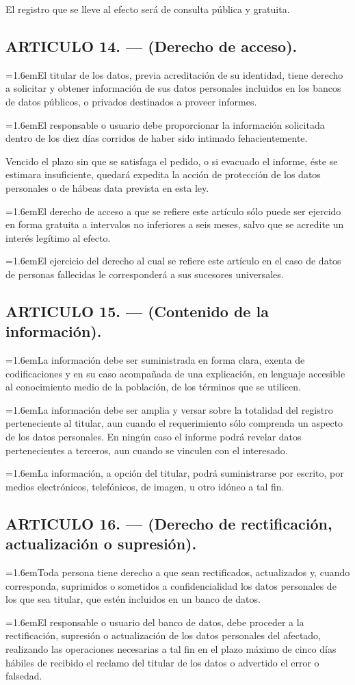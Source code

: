 \documentclass[10pt,a4paper]{article}
\newcommand{\articulo}[1]{\subsection{#1}}
\newcommand{\inciso}[2]{\par{\hangindent=1.6em\hangafter=1\makebox[1.6em][l]{#1}#2\par}}
\begin{document}
El registro que se lleve al efecto será de consulta pública y gratuita.

\articulo{ARTICULO 14. — (Derecho de acceso).}
\inciso{1.}{El titular de los datos, previa acreditación de su identidad, tiene derecho a solicitar y obtener información de sus datos personales incluidos en los bancos de datos públicos, o privados destinados a proveer informes.}

\inciso{2.}{El responsable o usuario debe proporcionar la información solicitada dentro de los diez días corridos de haber sido intimado fehacientemente.}

Vencido el plazo sin que se satisfaga el pedido, o si evacuado el informe, éste se estimara insuficiente, quedará expedita la acción de protección de los datos personales o de hábeas data prevista en esta ley.

\inciso{3.}{El derecho de acceso a que se refiere este artículo sólo puede ser ejercido en forma gratuita a intervalos no inferiores a seis meses, salvo que se acredite un interés legítimo al efecto.}

\inciso{4.}{El ejercicio del derecho al cual se refiere este artículo en el caso de datos de personas fallecidas le corresponderá a sus sucesores universales.}

\articulo{ARTICULO 15. — (Contenido de la información).}
\inciso{1.}{La información debe ser suministrada en forma clara, exenta de codificaciones y en su caso acompañada de una explicación, en lenguaje accesible al conocimiento medio de la población, de los términos que se utilicen.}

\inciso{2.}{La información debe ser amplia y versar sobre la totalidad del registro perteneciente al titular, aun cuando el requerimiento sólo comprenda un aspecto de los datos personales. En ningún caso el informe podrá revelar datos pertenecientes a terceros, aun cuando se vinculen con el interesado.}

\inciso{3.}{La información, a opción del titular, podrá suministrarse por escrito, por medios electrónicos, telefónicos, de imagen, u otro idóneo a tal fin.}

\articulo{ARTICULO 16. — (Derecho de rectificación, actualización o supresión).}
\inciso{1.}{Toda persona tiene derecho a que sean rectificados, actualizados y, cuando corresponda, suprimidos o sometidos a confidencialidad los datos personales de los que sea titular, que estén incluidos en un banco de datos.}

\inciso{2.}{El responsable o usuario del banco de datos, debe proceder a la rectificación, supresión o actualización de los datos personales del afectado, realizando las operaciones necesarias a tal fin en el plazo máximo de cinco días hábiles de recibido el reclamo del titular de los datos o advertido el error o falsedad.}
\end{document}
